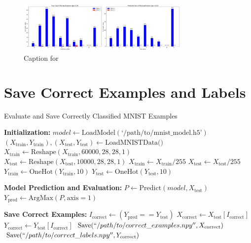 \documentclass{article}
\begin{document}
\begin{figure}[!htbp]
\centering
\includegraphics[width=0.75\textwidth]{combined_class_boundary_pgd/combined_class_8_misclassifications_eps_0.05.png}
\caption{Caption for }
\label{fig:combined_class_8_misclassifications_eps_0.05.png}
\end{figure}


\section{Save Correct Examples and Labels}

\begin{algorithm}[H]
\caption{Evaluate and Save Correctly Classified MNIST Examples}
\begin{algorithmic}[1]

\State \textbf{Initialization:}
\State $model \gets \text{LoadModel}(\text{`/path/to/mnist\_model.h5'})$
\State $(X_{\text{train}}, Y_{\text{train}}), (X_{\text{test}}, Y_{\text{test}}) \gets \text{LoadMNISTData()}$
\State $X_{\text{train}} \gets \text{Reshape}(X_{\text{train}}, 60000, 28, 28, 1)$
\State $X_{\text{test}} \gets \text{Reshape}(X_{\text{test}}, 10000, 28, 28, 1)$
\State $X_{\text{train}} \gets X_{\text{train}} / 255$
\State $X_{\text{test}} \gets X_{\text{test}} / 255$
\State $Y_{\text{train}} \gets \text{OneHot}(Y_{\text{train}}, 10)$
\State $Y_{\text{test}} \gets \text{OneHot}(Y_{\text{test}}, 10)$

\State \textbf{Model Prediction and Evaluation:}
\State $P \gets \text{Predict}(model, X_{\text{test}})$
\State $Y_{\text{pred}} \gets \text{ArgMax}(P, \text{axis}=1)$

\State \textbf{Save Correct Examples:}
\State $I_{\text{correct}} \gets (Y_{\text{pred}} == Y_{\text{test}})$
\State $X_{\text{correct}} \gets X_{\text{test}}[I_{\text{correct}}]$
\State $Y_{\text{correct}} \gets Y_{\text{test}}[I_{\text{correct}}]$
\State $\text{Save}(``/path/to/correct\_examples.npy'', X_{\text{correct}})$
\State $\text{Save}(``/path/to/correct\_labels.npy'', Y_{\text{correct}})$

\end{algorithmic}
\end{algorithm}
\end{document}
